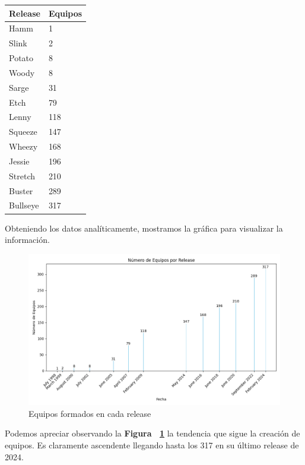 \documentclass[a4paper, 12pt]{book}
\begin{document}
\begin{table}[]
	\begin{center}
		\begin{tabular}{|l|l|}
			\hline
			Release  & Equipos \\ \hline
			Hamm     & 1       \\ \hline
			Slink    & 2       \\ \hline
			Potato   & 8       \\ \hline
			Woody    & 8       \\ \hline
			Sarge    & 31      \\ \hline
			Etch     & 79      \\ \hline
			Lenny    & 118     \\ \hline
			Squeeze  & 147     \\ \hline
			Wheezy   & 168     \\ \hline
			Jessie   & 196     \\ \hline
			Stretch  & 210     \\ \hline
			Buster   & 289     \\ \hline
			Bullseye & 317     \\ \hline
		\end{tabular}
	\end{center}
\end{table}

Obteniendo los datos analíticamente, mostramos la gráfica para visualizar la información.

\begin{figure}
	\centering
	\includegraphics[width=15cm, keepaspectratio]{img/Figura3_buena_equipos.png}
	\caption{Equipos formados en cada release}
	\label{fig:equipos}
\end{figure}

Podemos apreciar observando la \textbf{Figura ~\ref{fig:equipos}} la tendencia que sigue la creación de equipos. Es claramente ascendente llegando hasta los 317 en su último release de 2024.
\end{document}
